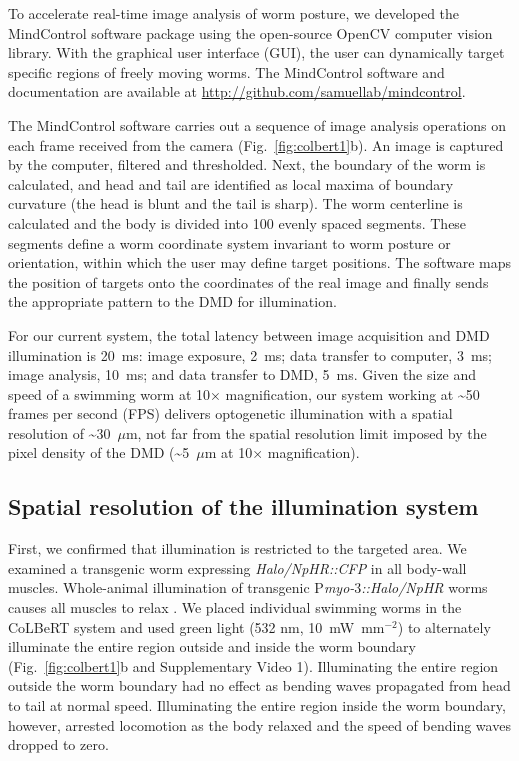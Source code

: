 \begin{FPfigure}
\end{FPfigure}

To accelerate real-time image analysis of worm posture, we developed the MindControl software package using the open-source OpenCV computer vision library\citep{bradski_opencv_2000}. With the graphical user interface (GUI), the user can dynamically target specific regions of freely moving worms. The MindControl software and documentation are available at \href{http://github.com/samuellab/mindcontrol}{http://github.com/samuellab/mindcontrol}.


The MindControl software carries out a sequence of image analysis operations on each frame received from the camera (Fig.~\ref{fig:colbert1}b). An image is captured by the computer, filtered and thresholded. Next, the boundary of the worm is calculated, and head and tail are identified as local maxima of boundary curvature (the head is blunt and the tail is sharp). The worm centerline is calculated and the body is divided into 100 evenly spaced segments. These segments define a worm coordinate system invariant to worm posture or orientation, within which the user may define target positions. The software maps the position of targets onto the coordinates of the real image and finally sends the appropriate pattern to the DMD for illumination.

For our current system, the total latency between image acquisition and DMD illumination is 20~ms: image exposure, 2~ms; data transfer to computer, 3~ms; image analysis, 10~ms; and data transfer to DMD, 5~ms. Given the size and speed of a swimming worm at 10× magnification, our system working at \textasciitilde50 frames per second (FPS) delivers optogenetic illumination with a spatial resolution of \textasciitilde30~$\mu$m, not far from the spatial resolution limit imposed by the pixel density of the DMD (\textasciitilde5~$\mu$m at 10× magnification).

\subsection{Spatial resolution of the illumination system}
First, we confirmed that illumination is restricted to the targeted area. We examined a transgenic worm expressing \textit{Halo/NpHR::CFP} in all body-wall muscles. Whole-animal illumination of transgenic P\textit{myo-$3$::Halo/NpHR} worms causes all muscles to relax \citep{zhang_multimodal_2007}. We placed individual swimming worms in the CoLBeRT system and used green light (532 nm, 10~mW~mm$^{-2}$) to alternately illuminate the entire region outside and inside the worm boundary (Fig.~\ref{fig:colbert1}b and Supplementary Video 1). Illuminating the entire region outside the worm boundary had no effect as bending waves propagated from head to tail at normal speed. Illuminating the entire region inside the worm boundary, however, arrested locomotion as the body relaxed and the speed of bending waves dropped to zero.

